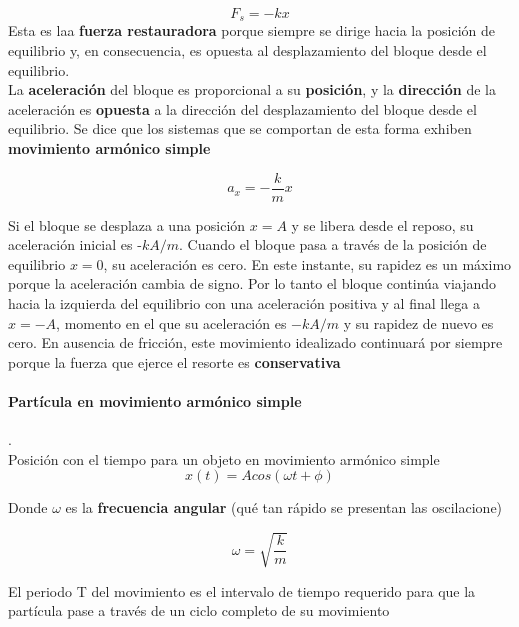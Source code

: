 \documentclass[10pt]{article}
\begin{document}
\begin{equation*}
	F_s = -kx
\end{equation*}
Esta es laa \textbf{fuerza restauradora} porque siempre se dirige hacia la posición de equilibrio y, en consecuencia, es opuesta al desplazamiento del bloque desde el equilibrio.\\
\linebreak
La \textbf{aceleración} del bloque es proporcional a su \textbf{posición}, y la \textbf{dirección} de la aceleración es \textbf{opuesta} a la dirección del desplazamiento del bloque desde el equilibrio. Se dice que los sistemas que se comportan de esta forma exhiben \textbf{movimiento armónico simple}

\begin{equation*}
	a_x = - \dfrac{k}{m}x
\end{equation*}

Si el bloque  se desplaza a una posición $x = A$ y se libera desde el reposo, su aceleración inicial es -$kA/m$. Cuando el bloque pasa a través de la posición de equilibrio $x = 0$, su aceleración es cero. En este instante, su rapidez es un máximo porque la aceleración cambia de signo. Por lo tanto el bloque continúa viajando hacia la izquierda del equilibrio con una aceleración positiva y al final llega a $x =-A$, momento en el que su aceleración es $-kA/m$ y su rapidez de nuevo es cero.  En ausencia de fricción, este movimiento idealizado continuará por siempre porque la fuerza que ejerce el resorte es \textbf{conservativa}

\paragraph{ Partícula en movimiento armónico simple}.\\

Posición con el tiempo para un objeto en movimiento armónico simple
\begin{equation*}
	x(t) = Acos(\omega t + \phi)
\end{equation*}

Donde $\omega$ es la \textbf{frecuencia angular} (qué tan rápido se presentan las oscilacione)

\begin{equation*}
	\omega = \sqrt{\dfrac{k}{m}}
\end{equation*}

El periodo T del movimiento es el intervalo de tiempo requerido para que la partícula pase a través de un ciclo completo de su movimiento
\end{document}
